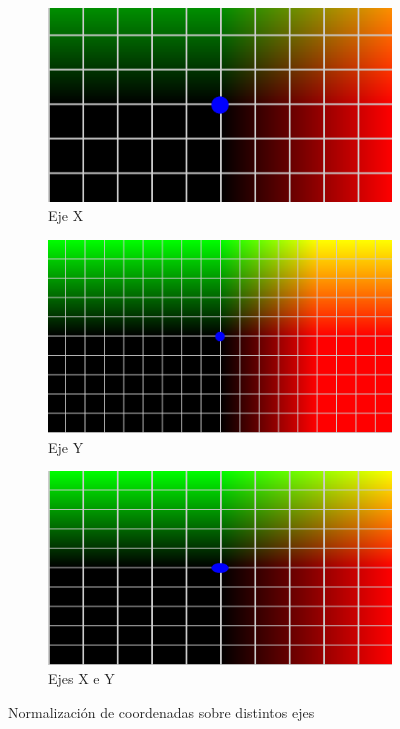 \begin{figure}[htbp]
    \centering
    \begin{subfigure}[b]{0.45\textwidth}
        \centering
        \includegraphics[width=\textwidth]{Plantilla-TFG-master/img/normX.png}
        \caption{Eje X}
    \end{subfigure}
    \hfill
    \begin{subfigure}[b]{0.45\textwidth}
        \centering
        \includegraphics[width=\textwidth]{Plantilla-TFG-master/img/normY.png}
        \caption{Eje Y}
    \end{subfigure}
    
    \medskip
    
    \begin{subfigure}[b]{0.45\textwidth}
        \centering
        \includegraphics[width=\textwidth]{Plantilla-TFG-master/img/normXY.png}
        \caption{Ejes X e Y}
    \end{subfigure}
    
    \caption{Normalización de coordenadas sobre distintos ejes}
    \label{fig:uv}
\end{figure}


